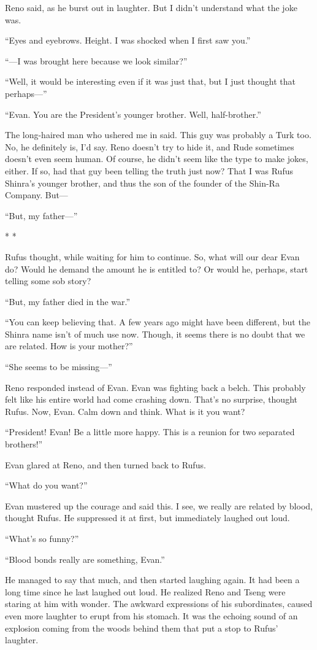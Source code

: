 \documentclass[oneside]{book}
\begin{document}
Reno said, as he burst out in laughter. But I didn’t understand what the joke was.

“Eyes and eyebrows. Height. I was shocked when I first saw you.”

“—I was brought here because we look similar?”

“Well, it would be interesting even if it was just that, but I just thought that perhaps—”

“Evan. You are the President’s younger brother. Well, half-brother.”

The long-haired man who ushered me in said. This guy was probably a Turk too. No, he definitely is, I’d say. Reno doesn’t try to hide it, and Rude sometimes doesn’t even seem human. Of course, he didn’t seem like the type to make jokes, either. If so, had that guy been telling the truth just now? That I was Rufus Shinra’s younger brother, and thus the son of the founder of the Shin-Ra Company. But—

“But, my father—”

* *

Rufus thought, while waiting for him to continue. So, what will our dear Evan do? Would he demand the amount he is entitled to? Or would he, perhaps, start telling some sob story?

“But, my father died in the war.”

“You can keep believing that. A few years ago might have been different, but the Shinra name isn’t of much use now. Though, it seems there is no doubt that we are related. How is your mother?”

“She seems to be missing—”

Reno responded instead of Evan. Evan was fighting back a belch. This probably felt like his entire world had come crashing down. That’s no surprise, thought Rufus. Now, Evan. Calm down and think. What is it you want?

“President! Evan! Be a little more happy. This is a reunion for two separated brothers!”

Evan glared at Reno, and then turned back to Rufus.

“What do you want?”

Evan mustered up the courage and said this. I see, we really are related by blood, thought Rufus. He suppressed it at first, but immediately laughed out loud.

“What’s so funny?”

“Blood bonds really are something, Evan.”

He managed to say that much, and then started laughing again. It had been a long time since he last laughed out loud. He realized Reno and Tseng were staring at him with wonder. The awkward expressions of his subordinates, caused even more laughter to erupt from his stomach. It was the echoing sound of an explosion coming from the woods behind them that put a stop to Rufus’ laughter.
\end{document}
